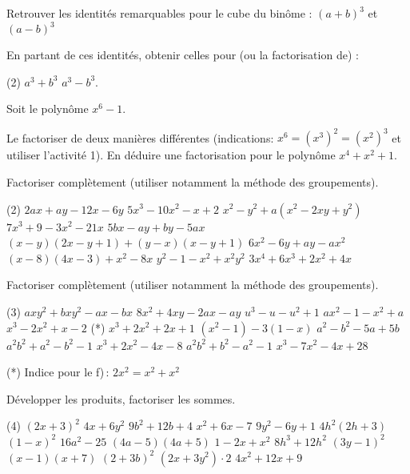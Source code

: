 \documentclass[a4paper,12pt]{report}
\begin{document}
\vspace*{-2\baselineskip}
\begin{acti}
Retrouver les identités remarquables pour le cube du binôme : $(a+b)^3$ et $(a-b)^3$

En partant de ces identités, obtenir celles pour (ou la factorisation de) :
	\begin{tasks}(2)
\task $a^3+b^3$
\task $a^3-b^3$.
	\end{tasks}
\end{acti}
\begin{acti}
Soit le polynôme $x^6-1$.
	\begin{tasks}
\task Le factoriser de deux manières différentes (indications: $x^6=\left(x^3\right)^2=\left(x^2\right)^3$ et utiliser l'activité 1).
\task En déduire une factorisation pour le polynôme $x^4+x^2+1$.
	\end{tasks}
\end{acti}

\begin{exo}
Factoriser complètement (utiliser notamment la méthode des groupements).
	\begin{tasks}(2)
\task $2 a x+a y-12 x-6 y$
\task $5 x^3-10 x^2-x+2$
\task $x^2-y^2+a\left(x^2-2 x y+y^2\right)$
\task $7 x^3+9-3 x^2-21 x$
\task $5 b x-a y+b y-5 a x$
\task $(x-y)(2 x-y+1)+(y-x)(x-y+1)$
\task $6 x^2-6 y+a y-a x^2$
\task $(x-8)(4 x-3)+x^2-8 x$
\task $y^2-1-x^2+x^2 y^2$
\task $3 x^4+6 x^3+2 x^2+4 x$
	\end{tasks}
\end{exo}
\begin{exo}
Factoriser complètement (utiliser notamment la méthode des groupements).
	\begin{tasks}(3)
\task $a x y^2+b x y^2-a x-b x$
\task $8 x^2+4 x y-2 a x-a y$
\task $u^3-u-u^2+1$
\task $a x^2-1-x^2+a$
\task $x^3-2 x^2+x-2$
\task (*) $x^3+2 x^2+2 x+1$
\task $\left(x^2-1\right)-3(1-x)$
\task $a^2-b^2-5 a+5 b$
\task $a^2 b^2+a^2-b^2-1$
\task $x^3+2 x^2-4 x-8$
\task $a^2 b^2+b^2-a^2-1$
\task $x^3-7 x^2-4 x+28$
	\end{tasks}
	(*) Indice pour le f)\,: $2 x^2=x^2+x^2$ 
\end{exo}
\begin{exo}
Développer les produits, factoriser les sommes.
	\begin{tasks}(4)
\task $(2 x+3)^2$
\task $4 x+6 y^2$
\task $9 b^2+12 b+4$
\task $x^2+6 x-7$
\task $9 y^2-6 y+1$
\task $4 h^2(2 h+3)$
\task $(1-x)^2$
\task $16 a^2-25$
\task $(4 a-5)(4 a+5)$
\task $1-2 x+x^2$
\task $8 h^3+12 h^2$
\task $(3 y-1)^2$
\task $(x-1)(x+7)$
\task $(2+3 b)^2$
\task $\left(2 x+3 y^2\right) \cdot 2$
\task $4 x^2+12 x+9$
	\end{tasks}
\end{exo}
\end{document}
